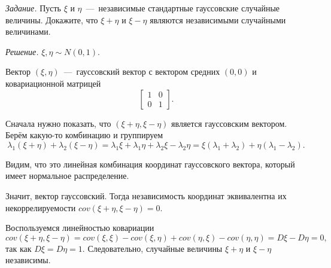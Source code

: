 \textit{Задание.}
Пусть $ \xi $ и
$ \eta $~---~независимые стандартные гауссовские случайные величины.
Докажите, что $ \xi + \eta $ и $ \xi - \eta $
являются независимыми случайными величинами.

\textit{Решение.}
$ \xi, \eta \sim N \left( 0, 1 \right) $.

Вектор $ \left( \xi, \eta \right) $~---~гауссовский вектор с вектором средних
$ \left( 0, 0 \right) $ и ковариационной матрицей
\begin{equation*}
  \begin{bmatrix}
    1 & 0 \\
    0 & 1
  \end{bmatrix}.
\end{equation*}

Сначала нужно показать,
что $ \left( \xi + \eta, \xi - \eta \right) $ является гауссовским вектором.
Берём какую-то комбинацию и группируем
\begin{equation*}
  \lambda_1 \left( \xi + \eta \right) + \lambda_2 \left( \xi - \eta \right) =
  \lambda_1 \xi + \lambda_1 \eta + \lambda_2 \xi - \lambda_2 \eta =
  \xi \left( \lambda_1 + \lambda_2 \right) +
  \eta \left( \lambda_1 - \lambda_2 \right).
\end{equation*}

Видим, что это линейная комбинация координат гауссовского вектора,
который имеет нормальное распределение.

Значит, вектор гауссовский.
Тогда независимость координат эквивалентна их некоррелируемости
$cov \left( \xi + \eta, \xi - \eta \right) =
 0$.

Воспользуемся линейностью ковариации
\begin{equation*}
  cov \left( \xi + \eta, \xi - \eta \right) =
  cov \left( \xi, \xi \right) - cov \left( \xi, \eta \right) +
  cov \left( \eta, \xi \right) - cov \left( \eta, \eta \right) =
  D \xi - D \eta =
  0,
\end{equation*}
так как $D \xi = D \eta = 1$.
Следовательно, случайные величины $ \xi + \eta $ и $ \xi - \eta $ независимы.
